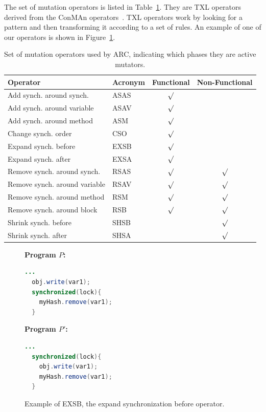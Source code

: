 \documentclass[10pt, conference, compsocconf]{IEEEtran}
\begin{document}
The set of mutation operators is listed in Table~\ref{tbl:operators}. They are 
TXL operators derived from the ConMAn operators~\cite{BCD06}. TXL operators 
work by looking for a pattern and then transforming it according to a set of
rules.  An example of one of our operators is shown in Figure~\ref{fig:EXSB_example}.

\begin{table}
\begin{center}
\begin{tabular}{|l|l|c|c|}
\hline
\textbf{Operator} &
\textbf{Acronym} &
\textbf{Functional} &
\textbf{Non-Functional}
\\\hline
Add synch. around synch. & ASAS & $\surd$ &
\\\hline
Add synch. around variable & ASAV & $\surd$ &
\\\hline
Add synch. around method & ASM & $\surd$ &
\\\hline
Change synch. order & CSO & $\surd$ &
\\\hline
Expand synch. before & EXSB & $\surd$ &
\\\hline
Expand synch. after & EXSA & $\surd$ &
\\\hline
Remove synch. around synch. & RSAS & $\surd$ & $\surd$
\\\hline
Remove synch. around variable & RSAV & $\surd$ & $\surd$
\\\hline
Remove synch. around method & RSM & $\surd$ & $\surd$
\\\hline
Remove synch. around block & RSB & $\surd$ & $\surd$
\\\hline
Shrink synch. before & SHSB & & $\surd$
\\\hline
Shrink synch. after & SHSA & & $\surd$
\\\hline
\end{tabular}
\caption{Set of mutation operators used by ARC, indicating which phases they
are active mutators.}
\label{tbl:operators}
\end{center}
\end{table}

\begin{figure}[h!]
\vspace{2mm}
\begin{minipage}{3.70cm}

\footnotesize{\textbf{ Program $P$:}}
\begin{lstlisting}[language=Java]
  ...
  obj.write(var1);
  synchronized(lock){
    myHash.remove(var1);
  }
\end{lstlisting}
\end{minipage}\hfill
\begin{minipage}{3.70cm}
\footnotesize{\textbf{ Program $P'$:}}
\begin{lstlisting}[language=Java]
  ...
  synchronized(lock){
    obj.write(var1);
    myHash.remove(var1);
  }
\end{lstlisting}
\end{minipage}

\caption{Example of EXSB, the expand synchronization before operator.}
\label{fig:EXSB_example}
\end{figure}
\end{document}
